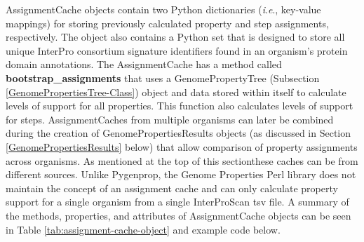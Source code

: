 AssignmentCache objects contain two Python dictionaries (\textit{i}.\textit{e}., 
key-value mappings) for storing previously calculated property and step 
assignments, respectively. The object also contains a Python set that is 
designed to store all unique InterPro consortium signature identifiers found in 
an organism's protein domain annotations. The AssignmentCache has a method 
called \textbf{bootstrap\_assignments} that uses a GenomePropertyTree 
(Subsection \ref{GenomePropertiesTree-Class}) object and data stored within 
itself to calculate levels of support for all properties. This function also 
calculates levels of support for steps. AssignmentCaches from multiple organisms 
can later be combined during the creation of GenomePropertiesResults objects (as 
discussed in Section \ref{GenomePropertiesResults} below) that allow comparison 
of property assignments across organisms. As mentioned at the top of this 
sectionthese caches can be from different sources. Unlike Pygenprop, the Genome 
Properties Perl library does not maintain the concept of an assignment cache and 
can only calculate property support for a single organism from a single 
InterProScan \gls{tsv} file. A summary of the methods, properties, and 
attributes of AssignmentCache objects can be seen in Table 
\ref{tab:assignment-cache-object} and example code below.

